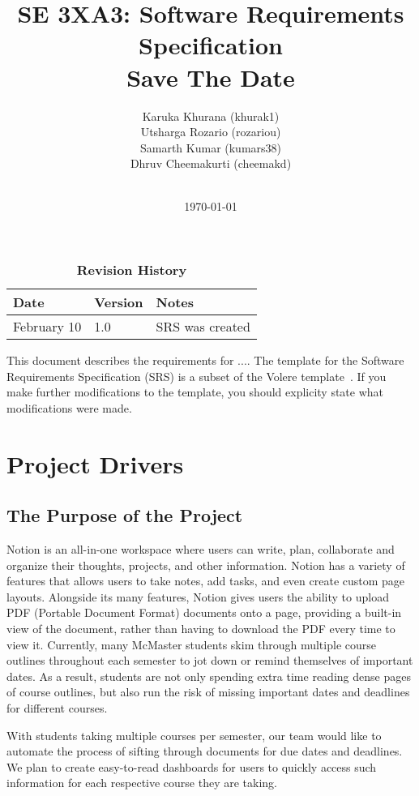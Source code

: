 \documentclass[12pt, titlepage]{article}
\title{SE 3XA3: Software Requirements Specification\\Save The Date}
\author{
        Karuka Khurana (khurak1)\\
        Utsharga Rozario (rozariou)\\
        Samarth Kumar (kumars38)\\
        Dhruv Cheemakurti (cheemakd)\\
        \\
}
\date{\today}
\begin{document}
\maketitle

\tableofcontents
\listoftables
\listoffigures

\begin{table}[bp]
\caption{\bf Revision History}
\begin{tabularx}{\textwidth}{p{3cm}p{2cm}X}
\toprule {\bf Date} & {\bf Version} & {\bf Notes}\\
\midrule
February 10 & 1.0 & SRS was created\\
\bottomrule
\end{tabularx}
\end{table}

\newpage


This document describes the requirements for ....  The template for the Software
Requirements Specification (SRS) is a subset of the Volere
template~\citep{RobertsonAndRobertson2012}.  If you make further modifications
to the template, you should explicity state what modifications were made.

\section{Project Drivers}

\subsection{The Purpose of the Project}
Notion is an all-in-one workspace where users can write, plan, collaborate and organize their thoughts, projects, and other information. Notion has a variety of features that allows users to take notes, add tasks, and even create custom page layouts. Alongside its many features, Notion gives users the ability to upload PDF (Portable Document Format) documents onto a page, providing a built-in view of the document, rather than having to download the PDF every time to view it. Currently, many McMaster students skim through multiple course outlines throughout each semester to jot down or remind themselves of important dates. As a result, students are not only spending extra time reading dense pages of course outlines, but also run the risk of missing important dates and deadlines for different courses.  

With students taking multiple courses per semester, our team would like to automate the process of sifting through documents for due dates and deadlines. We plan to create easy-to-read dashboards for users to quickly access such information for each respective course they are taking. 
\end{document}
